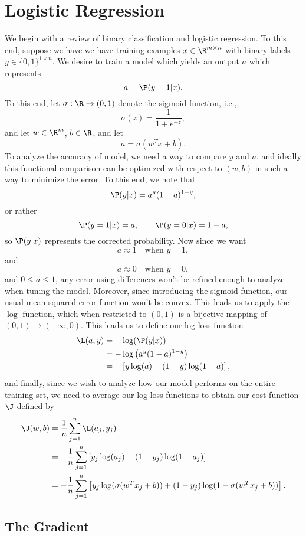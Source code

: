 

\section{Logistic Regression}

We begin with a review of binary classification and logistic regression.  To this end, suppose we have we have training examples $x\in\R^{m\times n}$ with binary labels $y\in\{0,1\}^{1\times n}$.  We desire to train a model which yields an output $a$ which represents
$$a=\P(y=1|x).$$
To this end, let $\sigma:\R\to(0,1)$ denote the sigmoid function, i.e.,
$$\sigma(z)=\frac{1}{1+e^{-z}},$$
and let $w\in\R^m$, $b\in\R$, and let
$$a=\sigma(w^Tx+b).$$
To analyze the accuracy of model, we need a way to compare $y$ and $a$, and ideally this functional comparison can be optimized with respect to $(w,b)$ in such a way to minimize the error.  To this end, we note that
$$\P(y|x)=a^y(1-a)^{1-y},$$
or rather
$$\P(y=1|x)=a,\qquad\P(y=0|x)=1-a,$$
so $\P(y|x)$ represents the corrected probability.    Now since we want
$$a\approx 1\quad\text{when } y=1,$$
and
$$a\approx 0\quad\text{when } y=0,$$
and $0\leq a\leq 1$, any error using differences won't be refined enough to analyze when tuning the model.  Moreover, since introducing the sigmoid function, our usual mean-squared-error function won't be convex.  This leads us to apply the $\log$ function, which when restricted to $(0,1)$ is a bijective mapping of $(0,1)\to(-\infty,0)$.  This leads us to define our log-loss function
\begin{align*}
	\L(a,y)&=-\log(\P(y|x))\\
	&=-\log\left(a^y(1-a)^{1-y}\right)\\
	&=-\left[y\log(a)+(1-y)\log(1-a)\right],
\end{align*}
and finally, since we wish to analyze how our model performs on the entire training set, we need to average our log-loss functions to obtain our cost function $\J$ defined by
\begin{align*}
	\J(w,b)&=\frac{1}{n}\sum_{j=1}^n\L(a_j,y_j)\\
	&=-\frac{1}{n}\sum_{j=1}^n\left[y_j\log(a_j)+(1-y_j)\log(1-a_j)\right]\\
	&=-\frac{1}{n}\sum_{j=1}^n\left[y_j\log(\sigma(w^Tx_j+b))+(1-y_j)\log(1-\sigma(w^Tx_j+b))\right].
\end{align*}

\subsection{The Gradient}

